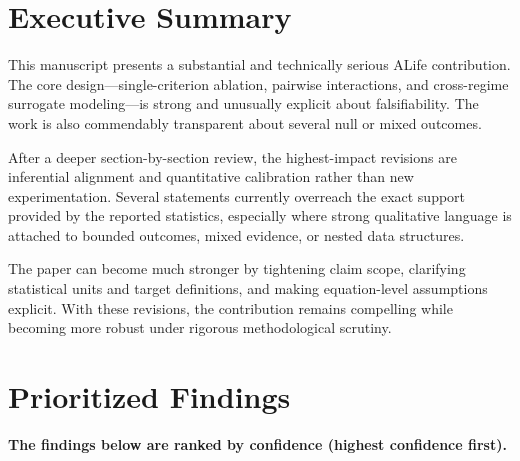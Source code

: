\documentclass[11pt]{article}
\begin{document}
\section*{Executive Summary}
This manuscript presents a substantial and technically serious ALife contribution. The core design---single-criterion ablation, pairwise interactions, and cross-regime surrogate modeling---is strong and unusually explicit about falsifiability. The work is also commendably transparent about several null or mixed outcomes.

After a deeper section-by-section review, the highest-impact revisions are inferential alignment and quantitative calibration rather than new experimentation. Several statements currently overreach the exact support provided by the reported statistics, especially where strong qualitative language is attached to bounded outcomes, mixed evidence, or nested data structures.

The paper can become much stronger by tightening claim scope, clarifying statistical units and target definitions, and making equation-level assumptions explicit. With these revisions, the contribution remains compelling while becoming more robust under rigorous methodological scrutiny.

\section*{Prioritized Findings}
\textbf{The findings below are ranked by confidence (highest confidence first).}
\end{document}
